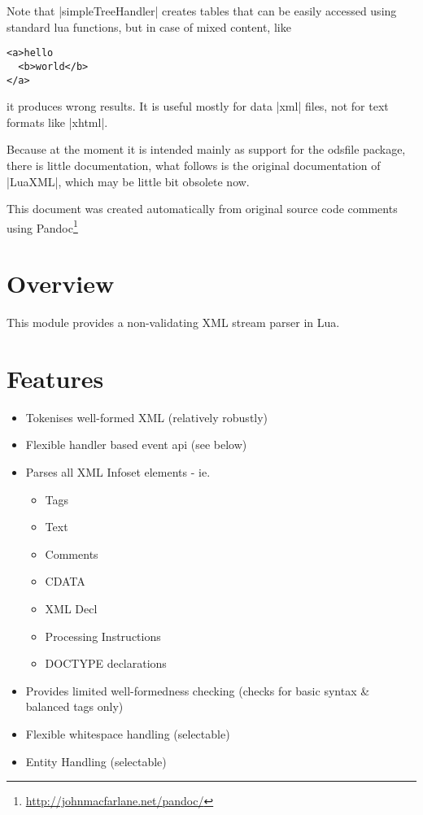 \documentclass{ltxdoc}
\begin{document}
Note that |simpleTreeHandler| creates tables that can be easily accessed using standard lua functions, but in case of mixed content, like
\begin{verbatim}
<a>hello
  <b>world</b>
</a>	  
\end{verbatim}
it produces wrong results. It is useful mostly for data |xml| files, not for text formats like |xhtml|.

Because at the moment it is intended mainly as support for the odsfile package, there is little documentation, 
what follows is the original documentation of |LuaXML|, which may be little bit obsolete now.

\clearpage
{}
\medskip

\noindent This document was created automatically from original source code comments using Pandoc\footnote{\url{http://johnmacfarlane.net/pandoc/}} 

\section{Overview}


This module provides a non-validating XML stream parser in Lua. 
\section{Features}

\begin{itemize}
\item
  Tokenises well-formed XML (relatively robustly)
\item
  Flexible handler based event api (see below)
\item
  Parses all XML Infoset elements - ie.
  \begin{itemize}
  \item
    Tags
  \item
    Text
  \item
    Comments
  \item
    CDATA
  \item
    XML Decl
  \item
    Processing Instructions
  \item
    DOCTYPE declarations
  \end{itemize}
\item
  Provides limited well-formedness checking (checks for basic syntax \&
  balanced tags only)
\item
  Flexible whitespace handling (selectable)
\item
  Entity Handling (selectable)
\end{itemize}
\end{document}
